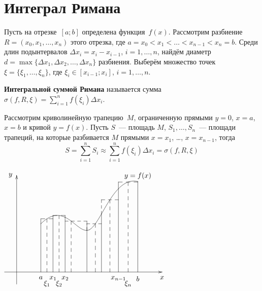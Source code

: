 \section{Интеграл Римана}
Пусть на отрезке~$[a; b]$ определена функция~$f(x)$.
Рассмотрим разбиение~$R = (x_0, x_1, \ldots, x_n)$ этого отрезка, где $a = x_0 < x_1 < \ldots < x_{n-1} < x_n = b$.
Среди длин подынтервалов $\Delta x_i = x_i - x_{i-1}$, $i = 1, \ldots, n$, найдём диаметр $d = \max \{ \Delta x_1, \Delta x_2, \ldots, \Delta x_n \}$ разбиения.
Выберём множество точек $\xi = \{ \xi_1, \ldots, \xi_n \}$, где $\xi_i \in [x_{i-1}; x_i]$, $i = 1, \ldots, n$.

\textbf{Интегральной суммой Римана} называется сумма $\displaystyle \sigma(f, R, \xi) = \sum_{i=1}^n f(\xi_i) \Delta x_i$.

Рассмотрим криволинейную трапецию~$M$, ограниченную прямыми $y = 0$, $x = a$, $x = b$ и кривой $y = f(x)$. Пусть $S$~--- площадь $M$, $S_1, \ldots, S_n$~--- площади трапеций, на которые разбивается $M$ прямыми $x = x_1$, \ldots, $x = x_{n-1}$, тогда
\begin{equation*}
S = \sum_{i=1}^n S_i \approx \sum_{i=1}^n f(\xi_i) \Delta x_i = \sigma(f, R, \xi)
\end{equation*}

\begin{center}
\noindent
$\begin{xy} /r12mm/:
(-0.5, 0); (6, 0) **@{-} *@{>} *++!U{x};
(0, -0.5); (0, 4) **@{-} *@{>} *++!R{y};
(1, 2) = "a"; (5, 3.75) = "b" **\crv{(2, 3) & (3, 0) & (4, 4)} *+!D{y = f(x)};
"a"; (1, 0) **@{-} *++!U{a};
"b"; (5, 0) **@{-} *++!U{b};
(1.5, 2.3225) = "x1"; (1.5, 0) **@{-} *++!U{x_1};
(2, 2.267) = "x2"; (2, 0) **@{-} *++!U{x_2};
(2.9, 1.72) = "x3"; (2.9, 0) **@{-};
(3.5, 2.4) = "x4"; (3.5, 0) **@{-};
(4.2, 3.452) = "x5"; (4.2, 0) **@{-} *++!U{x_{n-1}};
(1.25, 2.205) = "e1"; (1.25, 0) **@{--} *++++!U{\xi_1};
"a"; (1, 2.205) **@{--}; (1.5, 2.205) **@{--};
(1.75, 2.3435) = "e2"; (1.75, 0) **@{--} *++++!U{\xi_2};
"x1"; (1.5, 2.3435) **@{--}; (2, 2.3435) **@{--}; "x2" **@{--};
(2.25, 2.109) = "e3"; (2.25, 0) **@{--};
"x3"; (2.9, 2.109) **@{--}; (2, 2.109) **@{--};
(3.25, 1.999) = "e4"; (3.25, 0) **@{--};
"x3"; (2.9, 1.999) **@{--}; (3.5, 1.999) **@{--};
(3.85, 2.994) = "e5"; (3.85, 0) **@{--};
"x4"; (3.5, 2.994) **@{--}; (4.2, 2.994) **@{--};
(4.6, 3.7274) = "e6"; (4.6, 0) **@{--} *++++!U{\xi_n};
"x5"; (4.2, 3.7274) **@{--}; (5, 3.7274) **@{--};
\end{xy}$
\end{center}

